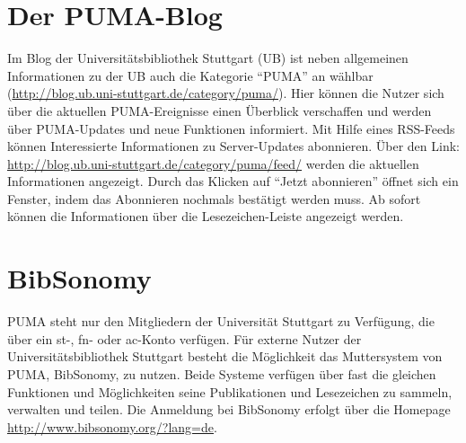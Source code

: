 \section{Der PUMA-Blog}
Im Blog der Universitätsbibliothek Stuttgart (UB) ist neben allgemeinen Informationen zu der UB auch die Kategorie \enquote{PUMA} an wählbar (\url{http://blog.ub.uni-stuttgart.de/category/puma/}). Hier können die Nutzer sich über die aktuellen PUMA-Ereignisse einen Überblick verschaffen und werden über PUMA-Updates und neue Funktionen informiert.\newline
Mit Hilfe eines RSS-Feeds können Interessierte Informationen zu Server-Updates abonnieren. Über den Link: \url{http://blog.ub.uni-stuttgart.de/category/puma/feed/} werden die aktuellen Informationen angezeigt. Durch das Klicken auf \enquote{Jetzt abonnieren} öffnet sich ein Fenster, indem das Abonnieren nochmals bestätigt werden muss. Ab sofort können die Informationen über die Lesezeichen-Leiste angezeigt werden. 
\section{BibSonomy}
PUMA steht nur den Mitgliedern der Universität Stuttgart zu Verfügung, die über ein st-, fn- oder ac-Konto  verfügen. Für externe Nutzer der Universitätsbibliothek Stuttgart besteht die Möglichkeit das Muttersystem von PUMA, BibSonomy, zu nutzen. Beide Systeme verfügen über fast die gleichen Funktionen und Möglichkeiten seine Publikationen und Lesezeichen zu sammeln, verwalten und teilen. \newline
Die Anmeldung bei BibSonomy erfolgt über die Homepage \newline
\url{http://www.bibsonomy.org/?lang=de}.  

